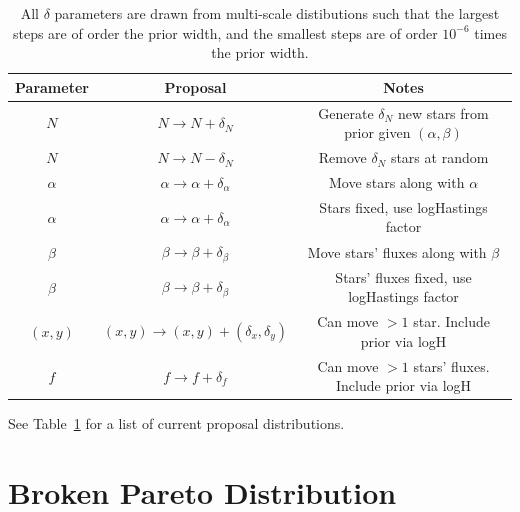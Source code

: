 \documentclass[letterpaper, 11pt]{article}
\begin{document}
\begin{table}
\begin{center}
\begin{tabular}{c|c|c}
Parameter & Proposal & Notes\\
\hline
$N$ & $N \to N + \delta_N$ & Generate $\delta_N$ new stars from prior given
$(\alpha, \beta)$\\
$N$ & $N \to N - \delta_N$ & Remove $\delta_N$ stars at random\\
$\alpha$ & $\alpha \to \alpha + \delta_\alpha$ & Move stars along with $\alpha$
\\
$\alpha$ & $\alpha \to \alpha + \delta_\alpha$ & Stars fixed, use logHastings
factor \\
$\beta$ & $\beta \to \beta + \delta_\beta$ & Move stars' fluxes along with
$\beta$\\
$\beta$ & $\beta \to \beta + \delta_\beta$ & Stars' fluxes fixed, use
logHastings factor \\
$(x,y)$ & $(x,y) \to (x,y)+(\delta_x, \delta_y)$ & Can move $>1$ star.
Include prior via logH \\
$f$ & $f \to f + \delta_f$ & Can move $>1$ stars' fluxes. Include prior
via logH
\end{tabular}
\end{center}
\caption{All $\delta$ parameters are drawn from multi-scale distibutions such
that the largest steps are of order the prior width, and the smallest steps
are of order $10^{-6}$ times the prior width.\label{proposals}}
\end{table}

See Table~\ref{proposals} for a list of current proposal distributions.

\section{Broken Pareto Distribution}
\end{document}
